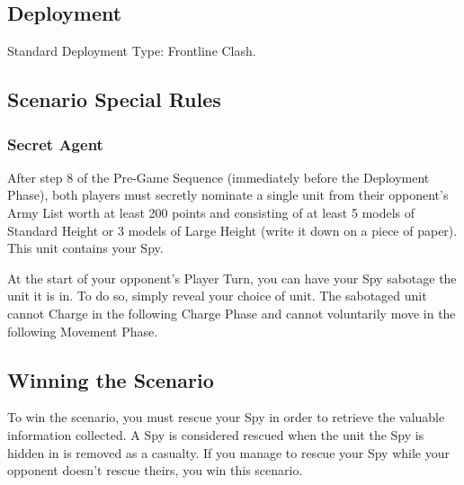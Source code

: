 
\label{MissionImpossible}


\subsection*{Deployment}

Standard Deployment Type: Frontline Clash.


\subsection*{Scenario Special Rules}

\subsubsection*{Secret Agent}

After step 8 of the Pre-Game Sequence (immediately before the Deployment Phase), both players must secretly nominate a single unit from their opponent's Army List worth at least 200 points and consisting of at least 5 models of Standard Height or 3 models of Large Height (write it down on a piece of paper). This unit contains your Spy.
			
At the start of your opponent's Player Turn, you can have your Spy sabotage the unit it is in. To do so, simply reveal your choice of unit. The sabotaged unit cannot Charge in the following Charge Phase and cannot voluntarily move in the following Movement Phase.

\subsection*{Winning the Scenario}

To win the scenario, you must rescue your Spy in order to retrieve the valuable information collected. A Spy is considered rescued when the unit the Spy is hidden in is removed as a casualty. If you manage to rescue your Spy while your opponent doesn't rescue theirs, you win this scenario.
